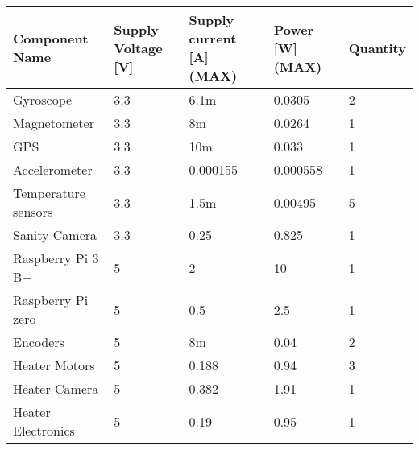 
\begin{center}
\begin{table}[H]
\begin{tabular}{|m{}|m{}|m{}|m{}|m{}|}
\hline
\textbf{Component Name} & \textbf{Supply Voltage {[}V{]}} & \textbf{Supply current {[}A{]} (MAX)} & \textbf{Power {[}W{]} (MAX)} & \textbf{Quantity} \\ \hline
Gyroscope               & 3.3                             & 6.1m                                & 0.0305                       & 2                 \\ \hline
 Magnetometer           & 3.3                           & 8m                     & 0.0264                      & 1 \\ \hline
GPS                     & 3.3                             & 10m                                 & 0.033                        & 1                 \\ \hline
Accelerometer           & 3.3                             & 0.000155                            & 0.000558                     & 1                 \\ \hline
Temperature sensors     & 3.3                             & 1.5m                                & 0.00495                      & 5                 \\ \hline
Sanity Camera           & 3.3                             & 0.25                                & 0.825                        & 1                 \\ \hline
Raspberry Pi 3 B+   & 5                               & 2                                   & 10                           & 1                 \\ \hline
Raspberry Pi zero	 	& 5   					& 0.5
& 2.5						   & 1				\\ \hline
Encoders                & 5                               & 8m                                  & 0.04                         & 2                 \\ \hline
Heater Motors           & 5                               & 0.188                               & 0.94                         & 3                 \\ \hline
Heater Camera           & 5                               & 0.382                               & 1.91                         & 1                 \\ \hline
Heater Electronics      & 5                               & 0.19                                & 0.95                         & 1                 \\ \hline

\end{tabular}
\end{table}
\end{center}
